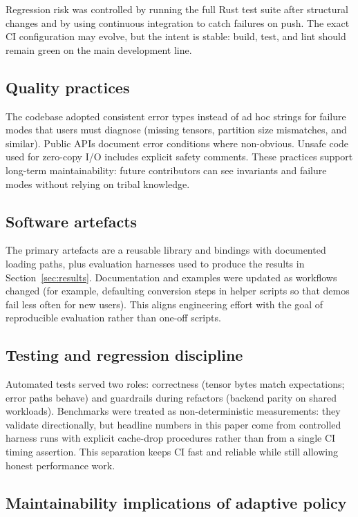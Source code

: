 Regression risk was controlled by running the full Rust test suite after structural changes and by using continuous integration to catch failures on push. The exact CI configuration may evolve, but the intent is stable: build, test, and lint should remain green on the main development line.

\subsection{Quality practices}

The codebase adopted consistent error types instead of ad hoc strings for failure modes that users must diagnose (missing tensors, partition size mismatches, and similar). Public APIs document error conditions where non-obvious. Unsafe code used for zero-copy I/O includes explicit safety comments. These practices support long-term maintainability: future contributors can see invariants and failure modes without relying on tribal knowledge.

\subsection{Software artefacts}

The primary artefacts are a reusable library and bindings with documented loading paths, plus evaluation harnesses used to produce the results in Section~\ref{sec:results}. Documentation and examples were updated as workflows changed (for example, defaulting conversion steps in helper scripts so that demos fail less often for new users). This aligns engineering effort with the goal of reproducible evaluation rather than one-off scripts.

\subsection{Testing and regression discipline}

Automated tests served two roles: correctness (tensor bytes match expectations; error paths behave) and guardrails during refactors (backend parity on shared workloads). Benchmarks were treated as non-deterministic measurements: they validate directionally, but headline numbers in this paper come from controlled harness runs with explicit cache-drop procedures rather than from a single CI timing assertion. This separation keeps CI fast and reliable while still allowing honest performance work.

\subsection{Maintainability implications of adaptive policy}

